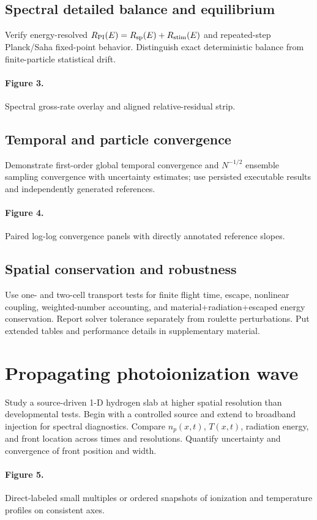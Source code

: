 \documentclass[11pt]{article}
\begin{document}
\subsection{Spectral detailed balance and equilibrium}
Verify energy-resolved $R_{\rm PI}(E)=R_{\rm sp}(E)+R_{\rm stim}(E)$ and repeated-step Planck/Saha fixed-point behavior. Distinguish exact deterministic balance from finite-particle statistical drift.
\paragraph{Figure 3.} Spectral gross-rate overlay and aligned relative-residual strip.
\subsection{Temporal and particle convergence}
Demonstrate first-order global temporal convergence and $N^{-1/2}$ ensemble sampling convergence with uncertainty estimates; use persisted executable results and independently generated references.
\paragraph{Figure 4.} Paired log-log convergence panels with directly annotated reference slopes.
\subsection{Spatial conservation and robustness}
Use one- and two-cell transport tests for finite flight time, escape, nonlinear coupling, weighted-number accounting, and material+radiation+escaped energy conservation. Report solver tolerance separately from roulette perturbations. Put extended tables and performance details in supplementary material.
\section{Propagating photoionization wave}
Study a source-driven 1-D hydrogen slab at higher spatial resolution than developmental tests. Begin with a controlled source and extend to broadband injection for spectral diagnostics. Compare $n_p(x,t)$, $T(x,t)$, radiation energy, and front location across times and resolutions. Quantify uncertainty and convergence of front position and width.
\paragraph{Figure 5.} Direct-labeled small multiples or ordered snapshots of ionization and temperature profiles on consistent axes.
\end{document}
